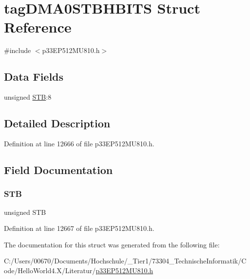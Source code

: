 \hypertarget{structtag_d_m_a0_s_t_b_h_b_i_t_s}{}\section{tag\+D\+M\+A0\+S\+T\+B\+H\+B\+I\+TS Struct Reference}
\label{structtag_d_m_a0_s_t_b_h_b_i_t_s}


{\ttfamily \#include $<$p33\+E\+P512\+M\+U810.\+h$>$}

\subsection*{Data Fields}
\begin{DoxyCompactItemize}
\item 
unsigned \hyperlink{structtag_d_m_a0_s_t_b_h_b_i_t_s_a9bd043a4db27e09b5035a563a8758fe7}{S\+TB}\+:8
\end{DoxyCompactItemize}


\subsection{Detailed Description}


Definition at line 12666 of file p33\+E\+P512\+M\+U810.\+h.



\subsection{Field Documentation}
\mbox{\label{structtag_d_m_a0_s_t_b_h_b_i_t_s_a9bd043a4db27e09b5035a563a8758fe7}} 
\subsubsection{\texorpdfstring{S\+TB}{STB}}
{\footnotesize\ttfamily unsigned S\+TB}



Definition at line 12667 of file p33\+E\+P512\+M\+U810.\+h.



The documentation for this struct was generated from the following file\+:\begin{DoxyCompactItemize}
\item 
C\+:/\+Users/00670/\+Documents/\+Hochschule/\+\_\+\+Tier1/73304\+\_\+\+Technische\+Informatik/\+Code/\+Hello\+World4.\+X/\+Literatur/\hyperlink{p33_e_p512_m_u810_8h}{p33\+E\+P512\+M\+U810.\+h}\end{DoxyCompactItemize}
